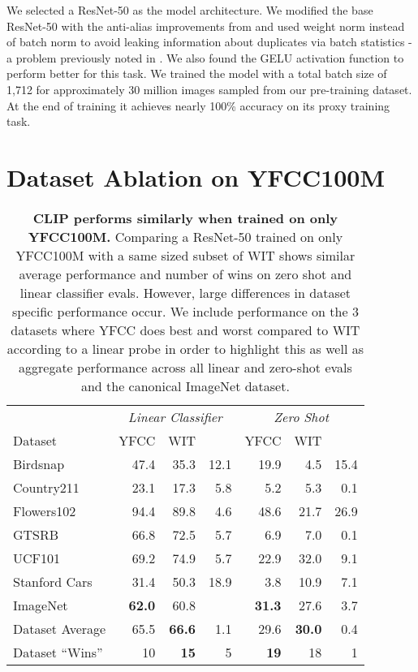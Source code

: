 \documentclass{article}
\begin{document}
We selected a ResNet-50 as the model architecture. We modified the base ResNet-50 with the anti-alias improvements from \cite{zhang2019making} and used weight norm \cite{salimans2016weight} instead of batch norm \citep{ioffe2015batch} to avoid leaking information about duplicates via batch statistics - a problem previously noted in \cite{henaff2020data}. We also found the GELU activation function \citep{hendrycks2016gaussian} to perform better for this task. We trained the model with a total batch size of 1,712 for approximately 30 million images sampled from our pre-training dataset. At the end of training it achieves nearly 100\% accuracy on its proxy training task.

\section{Dataset Ablation on YFCC100M}

\begin{table}[t]
\vskip 0.15in
\scriptsize
\begin{center}
\begin{tabular}{l|rrr|rrr}
\toprule
& \multicolumn{3}{c}{\textit{Linear Classifier}} & \multicolumn{3}{c}{\textit{Zero Shot}} \\
Dataset & YFCC & WIT &  & YFCC & WIT &  \\
\midrule
Birdsnap      & 47.4 & 35.3 & 12.1 & 19.9 &  4.5 & 15.4 \\
Country211    & 23.1 & 17.3 &  5.8 &  5.2 &  5.3 &  0.1 \\
Flowers102    & 94.4 & 89.8 &  4.6 & 48.6 & 21.7 & 26.9 \\
GTSRB         & 66.8 & 72.5 &  5.7 &  6.9 &  7.0 &  0.1 \\
UCF101        & 69.2 & 74.9 &  5.7 & 22.9 & 32.0 &  9.1 \\
Stanford Cars & 31.4 & 50.3 & 18.9 &  3.8 & 10.9 &  7.1 \\
\midrule
ImageNet & \textbf{62.0} & 60.8 &  & \textbf{31.3} & 27.6 & 3.7 \\
Dataset Average  & 65.5 & \textbf{66.6} & 1.1 & 29.6 & \textbf{30.0} & 0.4 \\
Dataset ``Wins'' & 10 & \textbf{15} & 5 & \textbf{19} & 18 & 1 \\
\bottomrule
\end{tabular}
\caption{\textbf{CLIP performs similarly when trained on only YFCC100M.} Comparing a ResNet-50 trained on only YFCC100M with a same sized subset of WIT shows similar average performance and number of wins on zero shot and linear classifier evals. However, large differences in dataset specific performance occur. We include performance on the 3 datasets where YFCC does best and worst compared to WIT according to a linear probe in order to highlight this as well as aggregate performance across all linear and zero-shot evals and the canonical ImageNet dataset.}
\label{dataset_ablation_table}
\end{center}
\vskip -0.1in
\end{table}
\end{document}
